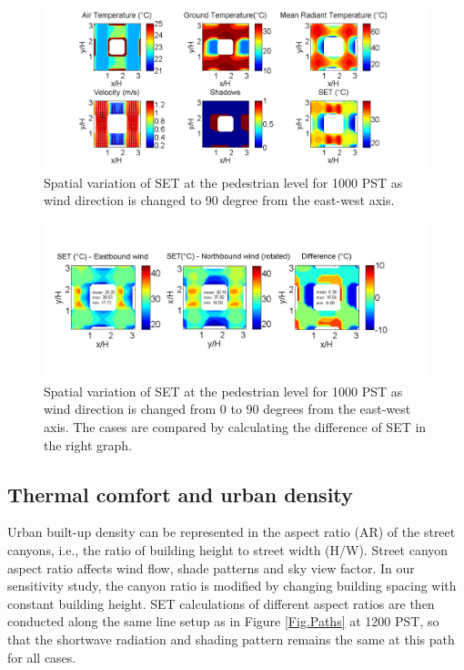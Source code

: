 \documentclass[smallextended]{svjour3}
\begin{document}
\begin{figure}[!h]
\graphicspath{ {image/} }
\centerline{\includegraphics[width=\textwidth]{Theta90_10AM.png}}    
\caption{Spatial variation of SET at the pedestrian level for 1000 PST as wind direction is changed to 90 degree from the east-west axis.}  
\label{Fig.Swind}
\end{figure}

\begin{figure}[!h]
\graphicspath{ {image/} }
\centerline{\includegraphics[trim= 0 1.8cm 2cm 1.7cm,clip=true, width=\textwidth]{compare_winds.png}}    
\caption{Spatial variation of SET at the pedestrian level for 1000 PST as wind direction is changed from 0 to 90 degrees from the east-west axis. The cases are compared by calculating the difference of SET in the right graph. }  
\label{Fig.SwindComp}
\end{figure}

\subsection{Thermal comfort and urban density}
Urban built-up density can be represented in the aspect ratio (AR) of the street canyons, i.e., the ratio of building height to street width (H/W). Street canyon aspect ratio affects wind flow, shade patterns and sky view factor. In our sensitivity study, the canyon ratio is modified by changing building spacing with constant building height. SET calculations of different aspect ratios are then conducted along the same line setup as in Figure \ref{Fig.Paths} at 1200 PST, so that the shortwave radiation and shading pattern remains the same at this path for all cases. 
\end{document}
